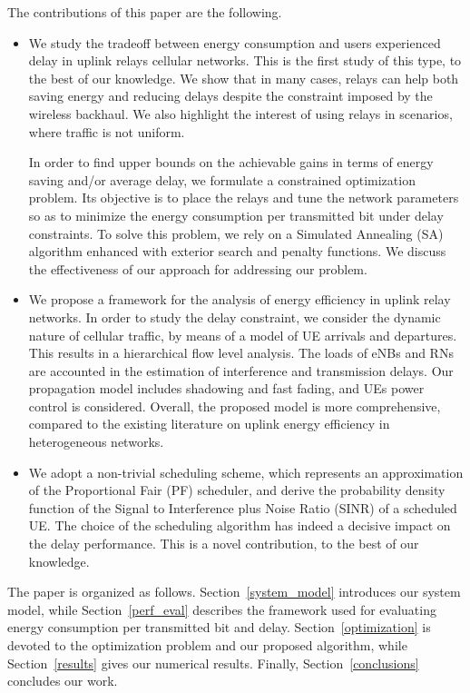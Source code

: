\documentclass[draftcls,onecolumn]{IEEEtran}
\theoremstyle{plain}
\theoremstyle{definition}
\begin{document}
The contributions of this paper are the following.
\begin{itemize}
\item We study the tradeoff between energy consumption and users experienced delay in uplink relays cellular networks. This is the first study of this type, to the best of our knowledge. We show that in many cases, relays can help both saving energy and reducing delays despite the constraint imposed by the wireless backhaul. We also highlight the interest of using relays in scenarios, where traffic is not uniform. 

In order to find upper bounds on the achievable gains in terms of energy saving and/or average delay, we formulate a constrained optimization problem. Its objective is to place the relays and tune the network parameters so as to minimize the energy consumption per transmitted bit under delay constraints. To solve this problem, we rely on a Simulated Annealing (SA) algorithm enhanced with exterior search and penalty functions. We discuss the effectiveness of our approach for addressing our problem.

\item We propose a framework for the analysis of energy efficiency in uplink relay networks. In order to study the delay constraint, we consider the dynamic nature of cellular traffic, by means of a model of UE arrivals and departures. This results in a hierarchical flow level analysis. The loads of eNBs and RNs are accounted in the estimation of interference and transmission delays. Our propagation model includes shadowing and fast fading, and UEs power control is considered. Overall, the proposed model is more comprehensive, compared to the existing literature on uplink energy efficiency in heterogeneous networks.    

\item We adopt a non-trivial scheduling scheme, which represents an approximation of the Proportional Fair (PF) scheduler, and derive the probability density function of the Signal to Interference plus Noise Ratio (SINR) of a scheduled UE. The choice of the scheduling algorithm has indeed a decisive impact on the delay performance. This is a novel contribution, to the best of our knowledge.  
\end{itemize}

The paper is organized as follows. Section~\ref{system_model} introduces our system model, while Section~\ref{perf_eval} describes the framework used for evaluating energy consumption per transmitted bit and delay. Section~\ref{optimization} is devoted to the optimization problem and our proposed algorithm, while Section~\ref{results} gives our numerical results. Finally, Section~\ref{conclusions} concludes our work.  
\end{document}
